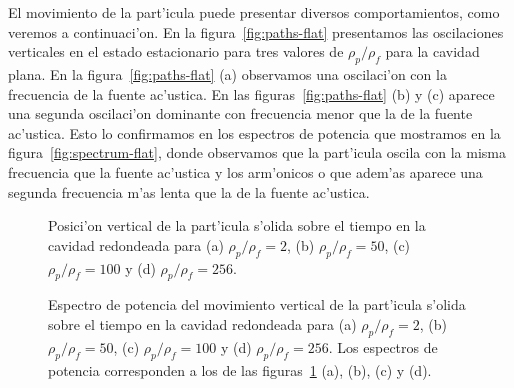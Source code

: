 El movimiento de la part'icula puede presentar diversos comportamientos, como veremos
a continuaci'on. En la figura~\ref{fig:paths-flat} presentamos las oscilaciones verticales
en el estado estacionario para tres valores de $\rho_p/\rho_f$ para la cavidad
plana. En la figura~\ref{fig:paths-flat} (a)
observamos una oscilaci'on con la frecuencia de la fuente ac'ustica. En las 
figuras~\ref{fig:paths-flat} (b) y (c) aparece una segunda oscilaci'on dominante con frecuencia
menor que la de la fuente ac'ustica. Esto lo confirmamos en los espectros de potencia que mostramos
en la figura~\ref{fig:spectrum-flat}, donde observamos 
que la part'icula oscila con la misma frecuencia que la fuente ac'ustica y los arm'onicos o que
adem'as aparece una segunda frecuencia m'as lenta que la de la fuente ac'ustica.



	
\begin{figure} 




\caption{\label{fig:paths-rounded}
Posici'on vertical de la part'icula s'olida sobre el tiempo en la cavidad redondeada para
(a) $\rho_p/\rho_f = 2$,
(b) $\rho_p/\rho_f = 50$,
(c) $\rho_p/\rho_f = 100$
y
(d) $\rho_p/\rho_f =256$.
}
\end{figure}

\begin{figure} 




\caption{\label{fig:spectrum-rounded}
Espectro de potencia del movimiento vertical de la part'icula s'olida sobre el tiempo en la cavidad redondeada para
(a) $\rho_p/\rho_f = 2$,
(b) $\rho_p/\rho_f = 50$,
(c) $\rho_p/\rho_f = 100$
y
(d) $\rho_p/\rho_f =256$.
Los espectros de potencia corresponden a los de las figuras~\ref{fig:paths-rounded} (a), (b), (c) y (d). 
}
\end{figure}


